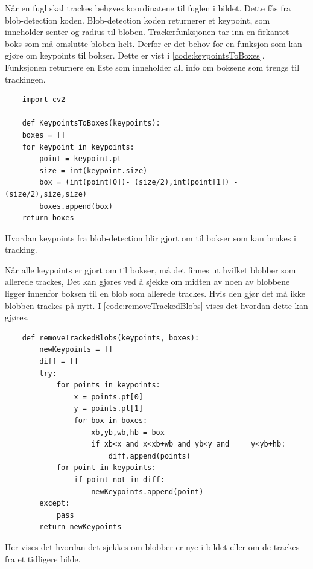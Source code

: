 Når en fugl skal trackes behøves koordinatene til fuglen i bildet. Dette fås fra blob-detection koden. Blob-detection koden returnerer et keypoint, som inneholder senter og radius til bloben. Trackerfunksjonen tar inn en firkantet boks som må omslutte bloben helt. Derfor er det behov for en funksjon som kan gjøre om keypoints til bokser. Dette er vist i \autoref{code:keypointsToBoxes}. Funksjonen returnere en liste som inneholder all info om boksene som trengs til trackingen.
\begin{code}
\begin{verbatim}
    import cv2
    
    def KeypointsToBoxes(keypoints):
    boxes = []
    for keypoint in keypoints:
        point = keypoint.pt
        size = int(keypoint.size)
        box = (int(point[0])- (size/2),int(point[1]) - (size/2),size,size)
        boxes.append(box)
    return boxes
\end{verbatim}
\caption{Hvordan keypoints fra blob-detection blir gjort om til bokser som kan brukes i tracking.}
\label{code:keypointsToBoxes}
\end{code}

Når alle keypoints er gjort om til bokser, må det finnes ut hvilket blobber som allerede trackes, Det kan gjøres ved å sjekke om midten av noen av blobbene ligger innenfor boksen til en blob som allerede trackes. Hvis den gjør det må ikke blobben trackes på nytt. I \autoref{code:removeTrackedBlobs} vises det hvordan dette kan gjøres.

\begin{code}
\begin{verbatim}
    def removeTrackedBlobs(keypoints, boxes):
        newKeypoints = []
        diff = []
        try:
            for points in keypoints:
                x = points.pt[0]
                y = points.pt[1]
                for box in boxes:
                    xb,yb,wb,hb = box
                    if xb<x and x<xb+wb and yb<y and     y<yb+hb:
                        diff.append(points)
            for point in keypoints:
                if point not in diff:
                    newKeypoints.append(point)
        except:
            pass
        return newKeypoints
\end{verbatim}
\caption{Her vises det hvordan det sjekkes om blobber er nye i bildet eller om de trackes fra et tidligere bilde.}
\label{code:removeTrackedBlobs}
\end{code}

